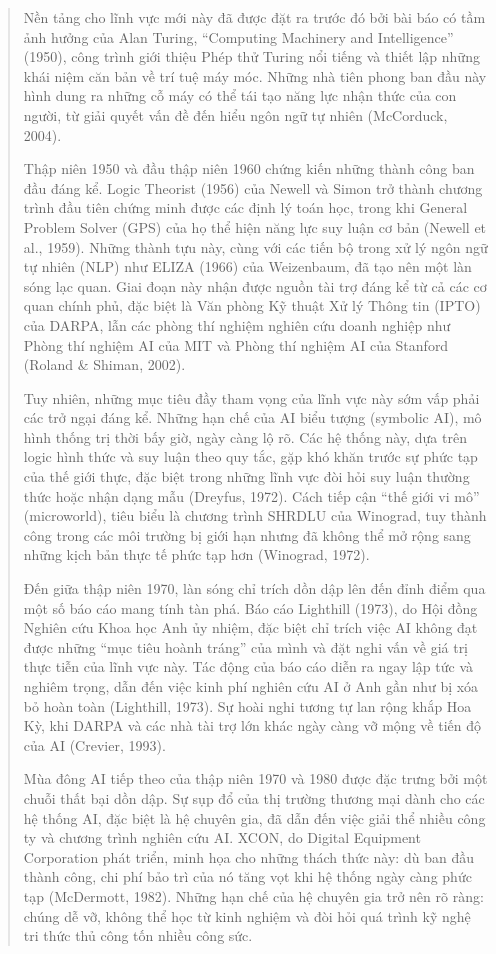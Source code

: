 \begin{quote}
Nền tảng cho lĩnh vực mới này đã được đặt ra trước đó bởi bài báo có tầm ảnh hưởng của Alan Turing, ``Computing Machinery and Intelligence'' (1950), công trình giới thiệu Phép thử Turing nổi tiếng và thiết lập những khái niệm căn bản về trí tuệ máy móc. Những nhà tiên phong ban đầu này hình dung ra những cỗ máy có thể tái tạo năng lực nhận thức của con người, từ giải quyết vấn đề đến hiểu ngôn ngữ tự nhiên (McCorduck, 2004).

Thập niên 1950 và đầu thập niên 1960 chứng kiến những thành công ban đầu đáng kể. Logic Theorist (1956) của Newell và Simon trở thành chương trình đầu tiên chứng minh được các định lý toán học, trong khi General Problem Solver (GPS) của họ thể hiện năng lực suy luận cơ bản (Newell et al., 1959). Những thành tựu này, cùng với các tiến bộ trong xử lý ngôn ngữ tự nhiên (NLP) như ELIZA (1966) của Weizenbaum, đã tạo nên một làn sóng lạc quan. Giai đoạn này nhận được nguồn tài trợ đáng kể từ cả các cơ quan chính phủ, đặc biệt là Văn phòng Kỹ thuật Xử lý Thông tin (IPTO) của DARPA, lẫn các phòng thí nghiệm nghiên cứu doanh nghiệp như Phòng thí nghiệm AI của MIT và Phòng thí nghiệm AI của Stanford (Roland \& Shiman, 2002).

Tuy nhiên, những mục tiêu đầy tham vọng của lĩnh vực này sớm vấp phải các trở ngại đáng kể. Những hạn chế của AI biểu tượng (symbolic AI), mô hình thống trị thời bấy giờ, ngày càng lộ rõ. Các hệ thống này, dựa trên logic hình thức và suy luận theo quy tắc, gặp khó khăn trước sự phức tạp của thế giới thực, đặc biệt trong những lĩnh vực đòi hỏi suy luận thường thức hoặc nhận dạng mẫu (Dreyfus, 1972). Cách tiếp cận ``thế giới vi mô'' (microworld), tiêu biểu là chương trình SHRDLU của Winograd, tuy thành công trong các môi trường bị giới hạn nhưng đã không thể mở rộng sang những kịch bản thực tế phức tạp hơn (Winograd, 1972).

Đến giữa thập niên 1970, làn sóng chỉ trích dồn dập lên đến đỉnh điểm qua một số báo cáo mang tính tàn phá. Báo cáo Lighthill (1973), do Hội đồng Nghiên cứu Khoa học Anh ủy nhiệm, đặc biệt chỉ trích việc AI không đạt được những ``mục tiêu hoành tráng'' của mình và đặt nghi vấn về giá trị thực tiễn của lĩnh vực này. Tác động của báo cáo diễn ra ngay lập tức và nghiêm trọng, dẫn đến việc kinh phí nghiên cứu AI ở Anh gần như bị xóa bỏ hoàn toàn (Lighthill, 1973). Sự hoài nghi tương tự lan rộng khắp Hoa Kỳ, khi DARPA và các nhà tài trợ lớn khác ngày càng vỡ mộng về tiến độ của AI (Crevier, 1993).

Mùa đông AI tiếp theo của thập niên 1970 và 1980 được đặc trưng bởi một chuỗi thất bại dồn dập. Sự sụp đổ của thị trường thương mại dành cho các hệ thống AI, đặc biệt là hệ chuyên gia, đã dẫn đến việc giải thể nhiều công ty và chương trình nghiên cứu AI. XCON, do Digital Equipment Corporation phát triển, minh họa cho những thách thức này: dù ban đầu thành công, chi phí bảo trì của nó tăng vọt khi hệ thống ngày càng phức tạp (McDermott, 1982). Những hạn chế của hệ chuyên gia trở nên rõ ràng: chúng dễ vỡ, không thể học từ kinh nghiệm và đòi hỏi quá trình kỹ nghệ tri thức thủ công tốn nhiều công sức.


\end{quote}

